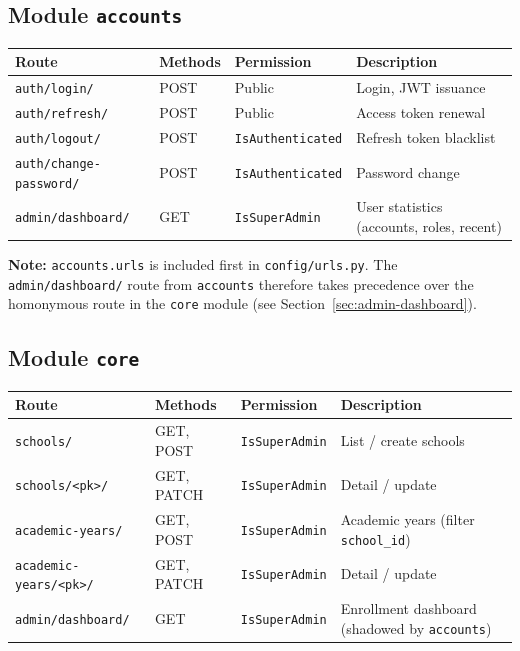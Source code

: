 \documentclass[11pt,a4paper]{article}
\begin{document}
\subsection{Module \texttt{accounts}}

\begin{longtable}{@{}lllp{5.5cm}@{}}
\toprule
\textbf{Route} & \textbf{Methods} & \textbf{Permission} & \textbf{Description} \\
\midrule
\endhead
\texttt{auth/login/} & POST & Public & Login, JWT issuance \\
\texttt{auth/refresh/} & POST & Public & Access token renewal \\
\texttt{auth/logout/} & POST & \texttt{IsAuthenticated} & Refresh token blacklist \\
\texttt{auth/change-password/} & POST & \texttt{IsAuthenticated} & Password change \\
\texttt{admin/dashboard/} & GET & \texttt{IsSuperAdmin} & User statistics (accounts, roles, recent) \\
\bottomrule
\end{longtable}

\textbf{Note:} \texttt{accounts.urls} is included first in \texttt{config/urls.py}. The \texttt{admin/dashboard/} route from \texttt{accounts} therefore takes precedence over the homonymous route in the \texttt{core} module (see Section~\ref{sec:admin-dashboard}).

\subsection{Module \texttt{core}}

\begin{longtable}{@{}lllp{5.5cm}@{}}
\toprule
\textbf{Route} & \textbf{Methods} & \textbf{Permission} & \textbf{Description} \\
\midrule
\endhead
\texttt{schools/} & GET, POST & \texttt{IsSuperAdmin} & List / create schools \\
\texttt{schools/<pk>/} & GET, PATCH & \texttt{IsSuperAdmin} & Detail / update \\
\texttt{academic-years/} & GET, POST & \texttt{IsSuperAdmin} & Academic years (filter \texttt{school\_id}) \\
\texttt{academic-years/<pk>/} & GET, PATCH & \texttt{IsSuperAdmin} & Detail / update \\
\texttt{admin/dashboard/} & GET & \texttt{IsSuperAdmin} & Enrollment dashboard (shadowed by \texttt{accounts}) \\
\bottomrule
\end{longtable}
\end{document}
